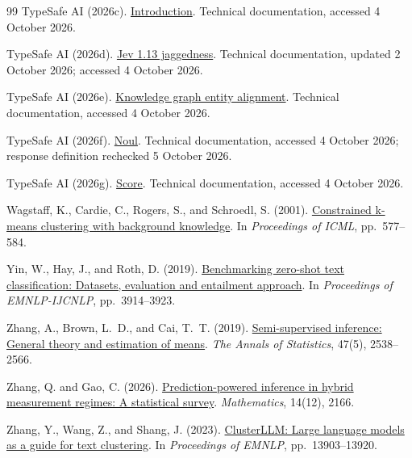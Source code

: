 \documentclass[11pt,a4paper]{article}
\begin{document}
\begin{thebibliography}{99}
TypeSafe AI (2026c).
\href{https://docs.typesafe.ai/introduction}{Introduction}.
Technical documentation, accessed 4 October 2026.

TypeSafe AI (2026d).
\href{https://docs.typesafe.ai/model-jaggedness/jev-1.13}{Jev 1.13 jaggedness}.
Technical documentation, updated 2 October 2026; accessed 4 October 2026.

TypeSafe AI (2026e).
\href{https://docs.typesafe.ai/cookbooks/entity_alignment}{Knowledge graph entity alignment}.
Technical documentation, accessed 4 October 2026.

TypeSafe AI (2026f).
\href{https://docs.typesafe.ai/primitives/noul}{Noul}.
Technical documentation, accessed 4 October 2026; response definition rechecked 5 October 2026.

TypeSafe AI (2026g).
\href{https://docs.typesafe.ai/primitives/score}{Score}.
Technical documentation, accessed 4 October 2026.

Wagstaff, K., Cardie, C., Rogers, S., and Schroedl, S. (2001).
\href{https://www.cs.cmu.edu/~dgovinda/pdf/icml-2001.pdf}{Constrained k-means clustering with background knowledge}.
In \emph{Proceedings of ICML}, pp.~577--584.

Yin, W., Hay, J., and Roth, D. (2019).
\href{https://doi.org/10.18653/v1/D19-1404}{Benchmarking zero-shot text classification: Datasets, evaluation and entailment approach}.
In \emph{Proceedings of EMNLP-IJCNLP}, pp.~3914--3923.

Zhang, A., Brown, L.~D., and Cai, T.~T. (2019).
\href{https://doi.org/10.1214/18-AOS1756}{Semi-supervised inference: General theory and estimation of means}.
\emph{The Annals of Statistics}, 47(5), 2538--2566.

Zhang, Q. and Gao, C. (2026).
\href{https://doi.org/10.3390/math14122166}{Prediction-powered inference in hybrid measurement regimes: A statistical survey}.
\emph{Mathematics}, 14(12), 2166.

Zhang, Y., Wang, Z., and Shang, J. (2023).
\href{https://doi.org/10.18653/v1/2023.emnlp-main.858}{ClusterLLM: Large language models as a guide for text clustering}.
In \emph{Proceedings of EMNLP}, pp.~13903--13920.


\end{thebibliography}
\end{document}
